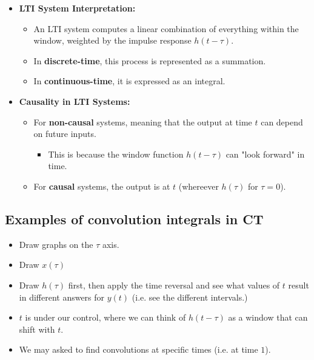 \begin{intuition}
\begin{itemize}
\begin{itemize}
            \item \textbf{LTI System Interpretation:}
            \begin{itemize}
                \item An LTI system computes a linear combination of everything within the window, weighted by the impulse response \( h(t - \tau) \).
                \item In \textbf{discrete-time}, this process is represented as a summation.
                \item In \textbf{continuous-time}, it is expressed as an integral.
            \end{itemize}
        
            \item \textbf{Causality in LTI Systems:}
            \begin{itemize}
                \item For \textbf{non-causal} systems, meaning that the output at time \( t \) can depend on future inputs.
                \begin{itemize}
                    \item  This is because the window function \( h(t - \tau) \) can "look forward" in time.
                \end{itemize}
                \item For \textbf{causal} systems, the output is at $t$ (whereever $h(\tau)$ for $\tau=0$).
            \end{itemize}
        \end{itemize}
    \end{itemize}
\end{intuition}

\subsection{Examples of convolution integrals in CT}
\begin{warning}
    \begin{itemize}
        \item Draw graphs on the $\tau$ axis. 
        \item Draw $x(\tau)$
        \item Draw $h(\tau)$ first, then apply the time reversal and see what values of $t$ result in different answers for $y(t)$ (i.e. see the different intervals.)
        \item $t$ is under our control, where we can think of $h(t-\tau)$ as a window that can shift with $t$.
        \item We may asked to find convolutions at specific times (i.e. at time $1$).
    \end{itemize}
\end{warning}

